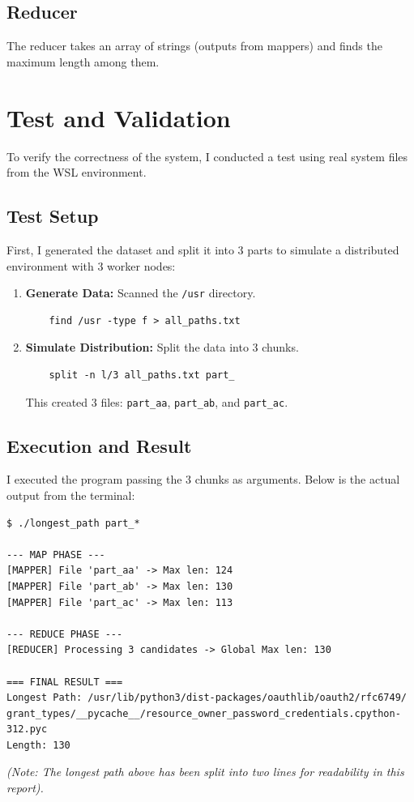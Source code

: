 \documentclass{article}
\begin{document}
\subsection{Reducer}
The reducer takes an array of strings (outputs from mappers) and finds the maximum length among them.

\section{Test and Validation}
To verify the correctness of the system, I conducted a test using real system files from the WSL environment.

\subsection{Test Setup}
First, I generated the dataset and split it into 3 parts to simulate a distributed environment with 3 worker nodes:
\begin{enumerate}
    \item \textbf{Generate Data:} Scanned the \texttt{/usr} directory.
    \begin{verbatim}
    find /usr -type f > all_paths.txt
    \end{verbatim}
    
    \item \textbf{Simulate Distribution:} Split the data into 3 chunks.
    \begin{verbatim}
    split -n l/3 all_paths.txt part_
    \end{verbatim}
    This created 3 files: \texttt{part\_aa}, \texttt{part\_ab}, and \texttt{part\_ac}.
\end{enumerate}

\subsection{Execution and Result}
I executed the program passing the 3 chunks as arguments. Below is the actual output from the terminal:

\begin{verbatim}
$ ./longest_path part_*

--- MAP PHASE ---
[MAPPER] File 'part_aa' -> Max len: 124
[MAPPER] File 'part_ab' -> Max len: 130
[MAPPER] File 'part_ac' -> Max len: 113

--- REDUCE PHASE ---
[REDUCER] Processing 3 candidates -> Global Max len: 130

=== FINAL RESULT ===
Longest Path: /usr/lib/python3/dist-packages/oauthlib/oauth2/rfc6749/
grant_types/__pycache__/resource_owner_password_credentials.cpython-312.pyc
Length: 130
\end{verbatim}
\textit{(Note: The longest path above has been split into two lines for readability in this report).}
\end{document}
